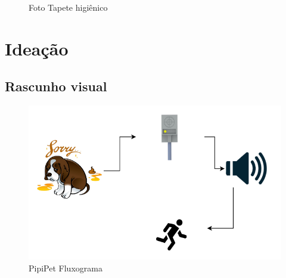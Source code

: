 \documentclass[12pt,a4paper]{article}
\let\oldsection\section
\renewcommand\section{\clearpage\oldsection}
\begin{document}
\begin{figure}[htb!]
	\centering
	\qquad
	\qquad
	\caption{Foto Tapete higiênico}
	\label{fig:tapete2}
\end{figure}

\section{Ideação}

\subsection{Rascunho visual}

\begin{figure}[htb!]
	\centering
	\includegraphics[width=13cm]{fluxograma}
	\caption{PipiPet Fluxograma}
	\label{fig:fluxograma}
\end{figure}
\end{document}
